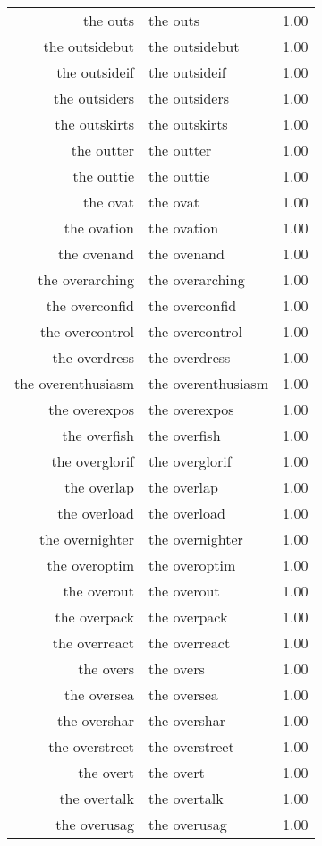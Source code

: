 \begin{table}[ht]
\begin{tabular}{rlr}
  the outs & the outs & 1.00 \\ 
  the outsidebut & the outsidebut & 1.00 \\ 
  the outsideif & the outsideif & 1.00 \\ 
  the outsiders & the outsiders & 1.00 \\ 
  the outskirts & the outskirts & 1.00 \\ 
  the outter & the outter & 1.00 \\ 
  the outtie & the outtie & 1.00 \\ 
  the ovat & the ovat & 1.00 \\ 
  the ovation & the ovation & 1.00 \\ 
  the ovenand & the ovenand & 1.00 \\ 
  the overarching & the overarching & 1.00 \\ 
  the overconfid & the overconfid & 1.00 \\ 
  the overcontrol & the overcontrol & 1.00 \\ 
  the overdress & the overdress & 1.00 \\ 
  the overenthusiasm & the overenthusiasm & 1.00 \\ 
  the overexpos & the overexpos & 1.00 \\ 
  the overfish & the overfish & 1.00 \\ 
  the overglorif & the overglorif & 1.00 \\ 
  the overlap & the overlap & 1.00 \\ 
  the overload & the overload & 1.00 \\ 
  the overnighter & the overnighter & 1.00 \\ 
  the overoptim & the overoptim & 1.00 \\ 
  the overout & the overout & 1.00 \\ 
  the overpack & the overpack & 1.00 \\ 
  the overreact & the overreact & 1.00 \\ 
  the overs & the overs & 1.00 \\ 
  the oversea & the oversea & 1.00 \\ 
  the overshar & the overshar & 1.00 \\ 
  the overstreet & the overstreet & 1.00 \\ 
  the overt & the overt & 1.00 \\ 
  the overtalk & the overtalk & 1.00 \\ 
  the overusag & the overusag & 1.00 \\ 

\end{tabular}
\end{table}
